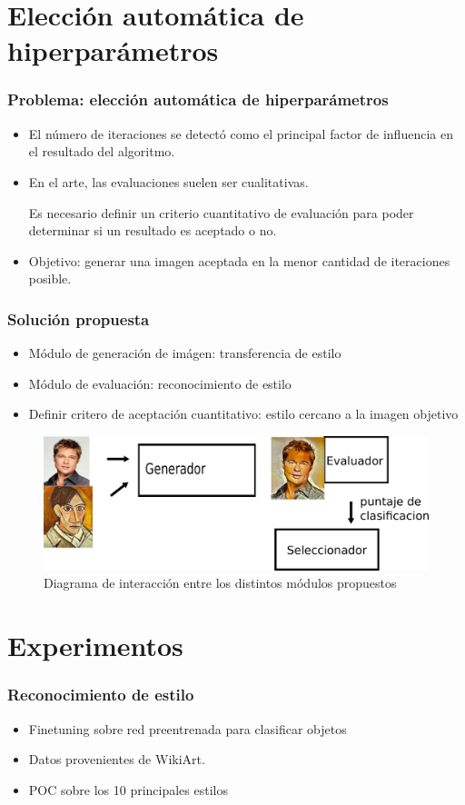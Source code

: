\documentclass[12pt,center]{beamer}
\newcommand{\subitem}{\par\qquad}
\begin{document}
\section{Elección automática de hiperparámetros}
\begin{frame}
  \frametitle{Problema: elección automática de hiperparámetros}
  \begin{itemize}
   \item El número de iteraciones se detectó como el principal factor de influencia en el resultado del algoritmo.
   \item En el arte, las evaluaciones suelen ser cualitativas.
    \subitem Es necesario definir un criterio cuantitativo de evaluación para poder determinar si un resultado es aceptado o no.
  \item Objetivo: generar una imagen aceptada en la menor cantidad de iteraciones posible.
  \end{itemize}

\end{frame}

\begin{frame}
 \frametitle{Solución propuesta}
  \begin{itemize}
   \item Módulo de generación de imágen: transferencia de estilo
   \item Módulo de evaluación: reconocimiento de estilo
   \item Definir critero de aceptación cuantitativo: estilo cercano a la imagen objetivo 
  \end{itemize}
  \begin{figure}[h]
    \begin{center}
      \includegraphics[width=\linewidth]{./img/diagrama.png}
    \end{center}
    \caption{Diagrama de interacción entre los distintos módulos propuestos}
  \end{figure}
\end{frame}

\section{Experimentos}
\begin{frame}
  \frametitle{Reconocimiento de estilo}
  \begin{itemize}
    \item Finetuning sobre red preentrenada para clasificar objetos
    \item Datos provenientes de WikiArt.
    \item POC sobre los 10 principales estilos
  \end{itemize}
\end{frame}
\end{document}
